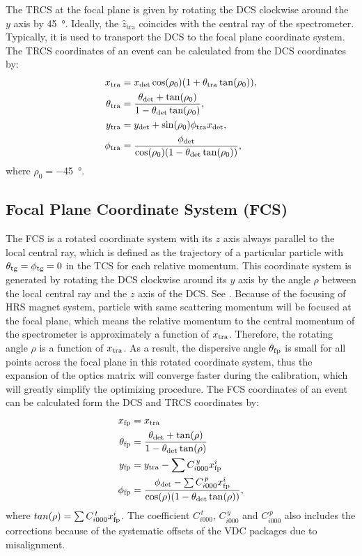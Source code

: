 The TRCS at the focal plane is given by rotating the DCS clockwise around the $y$ axis by \SI{45}{\degree}. Ideally, the $\hat{z}_{\mathrm{tra}}$ coincides with the central ray of the spectrometer. Typically, it is used to transport the DCS to the focal plane coordinate system. The TRCS coordinates of an event can be calculated from the DCS coordinates by:
\begin{align} \label{C6S1E1}
x_{\mathrm{tra}} & = x_{\mathrm{det}}\cos(\rho_0)(1+\theta_{\mathrm{tra}}\tan(\rho_0)), \\  \label{C6S1E2}
\theta_{\mathrm{tra}} & = \frac{\theta_{\mathrm{det}}+\tan(\rho_0)}{1-\theta_{\mathrm{det}}\tan(\rho_0)}, \\  \label{C6S1E3}
y_{\mathrm{tra}} & = y_{\mathrm{det}}+\sin(\rho_0)\phi_{\mathrm{tra}}x_{\mathrm{det}}, \\ \label{C6S1E4}
\phi_{\mathrm{tra}} & = \frac{\phi_{\mathrm{det}}}{\cos(\rho_0)(1-\theta_{\mathrm{det}}\tan(\rho_0))},
\end{align}
where $\rho_0=-$\SI{45}{\degree}.

\subsection[Focal Plane Coordinate System]{Focal Plane Coordinate System (FCS)}

The FCS is a rotated coordinate system with its $z$ axis always parallel to the local central ray, which is defined as the trajectory of a particular particle with $\theta_{\mathrm{tg}}=\phi_{\mathrm{tg}}=0$ in the TCS for each relative momentum. This coordinate system is generated by rotating the DCS clockwise around its $y$ axis by the angle $\rho$ between the local central ray and the $z$ axis of the DCS. See . Because of the focusing of HRS magnet system, particle with same scattering momentum will be focused at the focal plane, which means the relative momentum to the central momentum of the spectrometer is approximately a function of $x_{\mathrm{tra}}$. Therefore, the rotating angle $\rho$ is a function of $x_{\mathrm{tra}}$. As a result, the dispersive angle $\theta_{\mathrm{fp}}$ is small for all points across the focal plane in this rotated coordinate system, thus the expansion of the optics matrix will converge faster during the calibration, which will greatly simplify the optimizing procedure. The FCS coordinates of an event can be calculated form the DCS and TRCS coordinates by:
\begin{align} \label{C6S1E5}
x_{\mathrm{fp}} & = x_{\mathrm{tra}} \\ \label{C6S1E6}
\theta_{\mathrm{fp}} & = \frac{\theta_{\mathrm{det}}+\tan(\rho)}{1-\theta_{\mathrm{det}}\tan(\rho)} \\ \label{C6S1E7}
y_{\mathrm{fp}} & = y_{\mathrm{tra}}-\sum C_{i000}^{\,y} x_{\mathrm{fp}}^i \\ \label{C6S1E8}
\phi_{\mathrm{fp}} & = \frac{\phi_{\mathrm{det}}-\sum C_{i000}^{\,p}x_{\mathrm{fp}}^i}{\cos(\rho)(1-\theta_{\mathrm{det}}\tan(\rho))},
\end{align}
where $tan(\rho) = \sum C_{i000}^{\,t} x_{\mathrm{fp}}^i$. The coefficient $C_{i000}^{\,t}$, $C_{i000}^{\,y}$ and $C_{i000}^{\,p}$ also includes the corrections because of the systematic offsets of the VDC packages due to misalignment.

